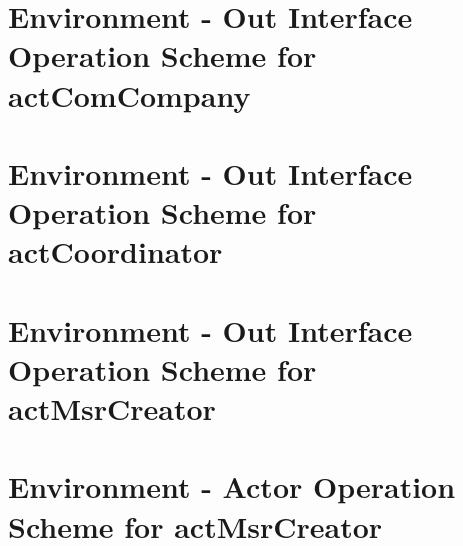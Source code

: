 \section{Environment - Out Interface Operation Scheme for actComCompany}
\label{OM-EM-OutInterface-OS-actComCompany}

\section{Environment - Out Interface Operation Scheme for actCoordinator}
\label{OM-EM-OutInterface-OS-actCoordinator}









\section{Environment - Out Interface Operation Scheme for actMsrCreator}
\label{OM-EM-OutInterface-OS-actMsrCreator}



		
\section{Environment - Actor Operation Scheme for actMsrCreator}
\label{OM-EM-actMsrCreator}
 



